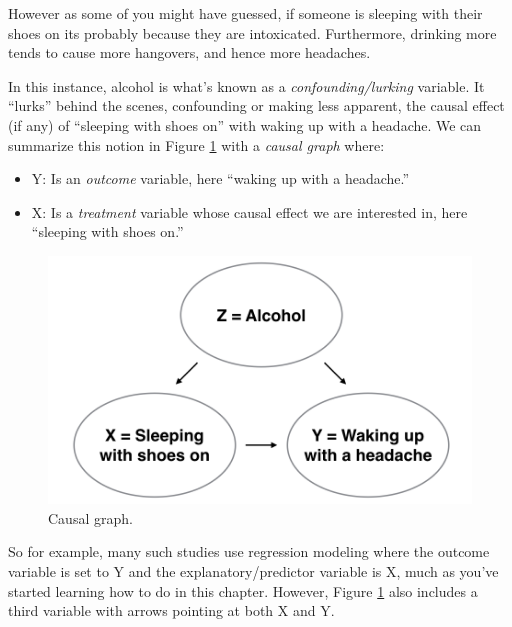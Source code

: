 \documentclass[12pt,]{krantz}
\providecommand{\tightlist}{%
  \setlength{\itemsep}{0pt}\setlength{\parskip}{0pt}}
\theoremstyle{definition}
\theoremstyle{definition}
\theoremstyle{definition}
\theoremstyle{remark}
\begin{document}
However as some of you might have guessed, if someone is sleeping with
their shoes on its probably because they are intoxicated. Furthermore,
drinking more tends to cause more hangovers, and hence more headaches.

In this instance, alcohol is what's known as a
\emph{confounding/lurking} variable. It ``lurks'' behind the scenes,
confounding or making less apparent, the causal effect (if any) of
``sleeping with shoes on'' with waking up with a headache. We can
summarize this notion in Figure \ref{fig:moderndive-figure-causal-graph}
with a \emph{causal graph} where:

\begin{itemize}
\tightlist
\item
  Y: Is an \emph{outcome} variable, here ``waking up with a headache.''
\item
  X: Is a \emph{treatment} variable whose causal effect we are
  interested in, here ``sleeping with shoes on.''
\end{itemize}

\begin{figure}

{\centering \includegraphics[width=\textwidth]{images/flowcharts/flowchart.009-cropped} 

}

\caption{Causal graph.}\label{fig:moderndive-figure-causal-graph}
\end{figure}

So for example, many such studies use regression modeling where the
outcome variable is set to Y and the explanatory/predictor variable is
X, much as you've started learning how to do in this chapter. However,
Figure \ref{fig:moderndive-figure-causal-graph} also includes a third
variable with arrows pointing at both X and Y.
\end{document}
